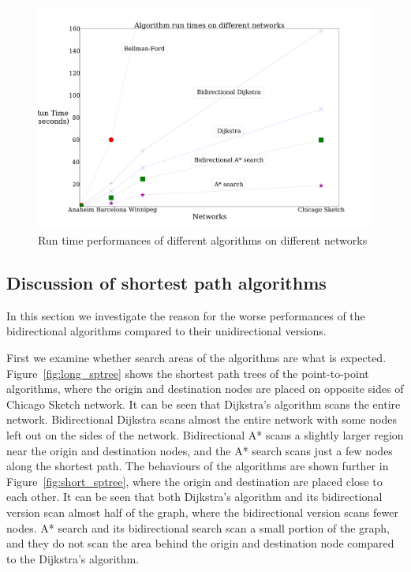 \begin{figure}[!ht]
    \centering
    \includegraphics[width=\textwidth]{img/runtime}
    \caption{Run time performances of different algorithms on different networks}
    \label{fig:allresults}
\end{figure}

\subsection{Discussion of shortest path algorithms}
In this section we investigate the reason for the worse performances of the bidirectional algorithms compared to their unidirectional versions. 

First we examine whether search areas of the algorithms are what is expected.
Figure~\ref{fig:long_sptree} shows the shortest path trees of the point-to-point algorithms, 
where the origin and destination nodes are placed on opposite sides of Chicago Sketch network.
It can be seen that Dijkstra's algorithm scans the entire network.
Bidirectional Dijkstra scans almost the entire network with some nodes left out on the sides of the network.
Bidirectional A* scans a slightly larger region near the origin and destination nodes,
and the A* search scans just a few nodes along the shortest path.
The behaviours of the algorithms are shown further in Figure~\ref{fig:short_sptree},
where the origin and destination are placed close to each other.
It can be seen that both Dijkstra's algorithm and its bidirectional version scan almost half of the graph,
where the bidirectional version scans fewer nodes.
A* search and its bidirectional search scan a small portion of the graph,
and they do not scan the area behind the origin and destination node compared to the Dijkstra's algorithm.

